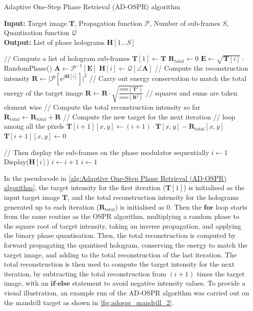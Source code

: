\begin{algorithm}[H]
  \caption{Adaptive One-Step Phase Retrieval (AD-OSPR) algorithm}\label{alg:Adaptive One-Step Phase Retrieval (AD-OSPR) algorithm}
  \textbf{Input:} Target image $\textbf{T}$, Propagation function $\mathcal{P}$, Number of sub-frames $S$, Quantisation function $\mathcal{Q}$\\
  \textbf{Output:} List of phase holograms $\textbf{H}[1\ldots S]$
  \begin{algorithmic}
    \State // Compute a list of hologram sub-frames
    \State $\textbf{T}[1] \gets \textbf{T}$
    \State $\textbf{R}_{total} \gets 0$
    \State $\textbf{E} \gets \sqrt{\textbf{T}[i]} \cdot$ RandomPhase()
    \State $\textbf{A} \gets \mathcal{P}^{-1}[\textbf{E}]$
    \State $\textbf{H}[i] \gets \mathcal{Q}[\angle \textbf{A}]$
    \State // Compute the reconstruction intensity
    \State $\textbf{R} \gets \vert \mathcal{P}[\mathrm{e}^{j\textbf{H}[i]}] \vert ^2$
    \State // Carry out energy conservation to match the total energy of the target image
    \State $\textbf{R} \gets \textbf{R} \cdot \sqrt{\frac{sum(\textbf{T}^2)}{sum(\textbf{R}^2)}} $ // squares and sums are taken element wise
    \State // Compute the total reconstruction intensity so far
    \State $\textbf{R}_{total} \gets \textbf{R}_{total} + \textbf{R}$
    \State // Compute the new target for the next iteration
     // loop among all the pixels
    \State $\textbf{T}[i+1][x,y] \gets (i+1)\cdot \textbf{T}[x,y] - \textbf{R}_{total}[x,y]$
    \Else
    \State $\textbf{T}[i+1][x,y] \gets 0$
    \EndIf
    \EndFor

    \EndFor
    \State // Then display the sub-frames on the phase modulator sequentially
    \State $i\gets 1$
    \State Display($\textbf{H}[i]$)
    \State $i\gets i + 1$
    \State $i\gets 1$
    \EndIf
    \EndWhile
  \end{algorithmic}
\end{algorithm}

In the pseudocode in \cref{alg:Adaptive One-Step Phase Retrieval (AD-OSPR) algorithm}, the target intensity for the first iteration ($\textbf{T}[1]$) is initialised as the input target image $\textbf{T}$, and the total reconstruction intensity for the holograms generated up to each iteration ($\textbf{R}_{total}$) is initialised as 0. Then the $\textbf{for}$ loop starts from the same routine as the OSPR algorithm, multiplying a random phase to the square root of target intensity, taking an inverse propagation, and applying the binary phase quantisation. Then, the total reconstruction is computed by forward propagating the quantised hologram, conserving the energy to match the target image, and adding to the total reconstruction of the last iteration. The total reconstruction is then used to compute the target intensity for the next iteration, by subtracting the total reconstruction from $(i+1)$ times the target image, with an $\textbf{if-else}$ statement to avoid negative intensity values. To provide a visual illustration, an example run of the AD-OSPR algorithm was carried out on the mandrill target as shown in \cref{fig:adospr_mandrill_2}.

